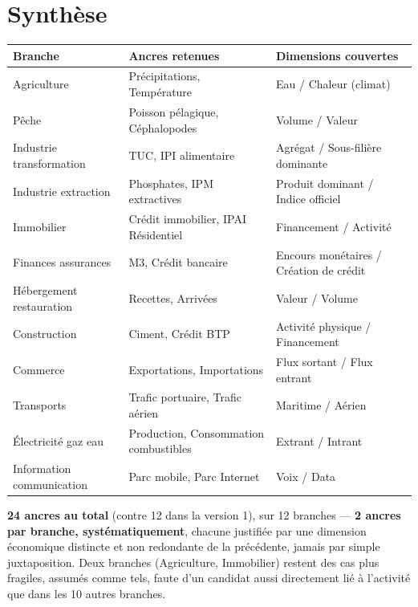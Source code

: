 \documentclass[11pt,a4paper]{article}
\begin{document}
\section{Synthèse}

\begin{fichebox}
\begin{center}
\small
\begin{tabular}{p{4cm}p{5.2cm}p{4.2cm}}
\toprule
\textbf{Branche} & \textbf{Ancres retenues} & \textbf{Dimensions couvertes} \\
\midrule
Agriculture & Précipitations, Température & Eau / Chaleur (climat) \\
Pêche & Poisson pélagique, Céphalopodes & Volume / Valeur \\
Industrie transformation & TUC, IPI alimentaire & Agrégat / Sous-filière dominante \\
Industrie extraction & Phosphates, IPM extractives & Produit dominant / Indice officiel \\
Immobilier & Crédit immobilier, IPAI Résidentiel & Financement / Activité \\
Finances assurances & M3, Crédit bancaire & Encours monétaires / Création de crédit \\
Hébergement restauration & Recettes, Arrivées & Valeur / Volume \\
Construction & Ciment, Crédit BTP & Activité physique / Financement \\
Commerce & Exportations, Importations & Flux sortant / Flux entrant \\
Transports & Trafic portuaire, Trafic aérien & Maritime / Aérien \\
Électricité gaz eau & Production, Consommation combustibles & Extrant / Intrant \\
Information communication & Parc mobile, Parc Internet & Voix / Data \\
\bottomrule
\end{tabular}
\end{center}
\end{fichebox}

\textbf{24 ancres au total} (contre 12 dans la version 1), sur 12 branches --- \textbf{2 ancres par branche, systématiquement}, chacune justifiée par une dimension économique distincte et non redondante de la précédente, jamais par simple juxtaposition. Deux branches (Agriculture, Immobilier) restent des cas plus fragiles, assumés comme tels, faute d'un candidat aussi directement lié à l'activité que dans les 10 autres branches.
\end{document}
